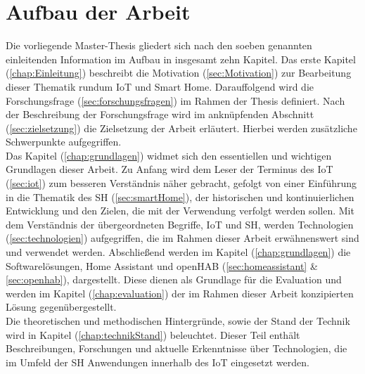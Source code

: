 \section{Aufbau der Arbeit}
\label{sec:aufbau}
    Die vorliegende Master-Thesis gliedert sich nach den soeben genannten einleitenden Information im Aufbau in insgesamt 
    zehn Kapitel. Das erste Kapitel (\ref{chap:Einleitung}) beschreibt die Motivation (\ref{sec:Motivation}) zur Bearbeitung 
    dieser Thematik rundum \acs{IoT} und Smart Home. Darauffolgend wird die 
    Forschungsfrage (\ref{sec:forschungsfragen}) im Rahmen der Thesis definiert. Nach der 
    Beschreibung der Forschungsfrage wird im anknüpfenden Abschnitt (\ref{sec:zielsetzung}) die Zielsetzung der 
    Arbeit erläutert. Hierbei werden zusätzliche Schwerpunkte aufgegriffen. 
    \\
    \linebreak
    Das Kapitel (\ref{chap:grundlagen}) widmet sich den essentiellen und wichtigen Grundlagen dieser Arbeit. Zu Anfang wird dem 
    Leser der Terminus des \acl{IoT} (\ref{sec:iot}) zum besseren Verständnis näher gebracht, 
    gefolgt von einer Einführung in die Thematik des \acl{SH} (\ref{sec:smartHome}), der 
    historischen und kontinuierlichen Entwicklung und den Zielen, die mit der Verwendung verfolgt 
    werden sollen. Mit dem Verständnis der übergeordneten Begriffe, \acs{IoT} und \acl{SH}, werden Technologien 
    (\ref{sec:technologien}) aufgegriffen, die im Rahmen dieser Arbeit erwähnenswert sind und verwendet werden. %
    Abschließend werden im Kapitel (\ref{chap:grundlagen}) die Softwarelösungen, Home Assistant 
    und openHAB (\ref{sec:homeassistant} \& \ref{sec:openhab}), dargestellt. Diese dienen als Grundlage für die Evaluation und werden im Kapitel 
    (\ref{chap:evaluation}) der im Rahmen dieser Arbeit konzipierten Lösung gegenübergestellt. 
    \\
    \linebreak
    Die theoretischen und methodischen Hintergründe, sowie der Stand der Technik wird in Kapitel (\ref{chap:technikStand})
    beleuchtet. Dieser Teil enthält Beschreibungen, Forschungen und aktuelle Erkenntnisse über Technologien, die im Umfeld der 
    \acl{SH} Anwendungen innerhalb des \acs{IoT} eingesetzt werden. 
    \\
    \linebreak
